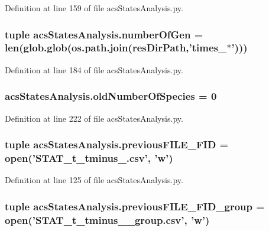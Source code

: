 Definition at line 159 of file acs\-States\-Analysis.\-py.

\hypertarget{a00104_a54acb4eba0735e72c2a820383febd37f}{
\subsubsection[{number\-Of\-Gen}]{\setlength{\rightskip}{0pt plus 5cm}tuple acs\-States\-Analysis.\-number\-Of\-Gen = len(glob.\-glob(os.\-path.\-join({\bf res\-Dir\-Path},'times\-\_\-$\ast$')))}}\label{a00104_a54acb4eba0735e72c2a820383febd37f}


Definition at line 184 of file acs\-States\-Analysis.\-py.

\hypertarget{a00104_abe1ce9bb85ee916d2046efc5c3fe6b30}{
\subsubsection[{old\-Number\-Of\-Species}]{\setlength{\rightskip}{0pt plus 5cm}acs\-States\-Analysis.\-old\-Number\-Of\-Species = 0}}\label{a00104_abe1ce9bb85ee916d2046efc5c3fe6b30}


Definition at line 222 of file acs\-States\-Analysis.\-py.

\hypertarget{a00104_aba65725a1bd6d1b891b02dc7f3db2335}{
\subsubsection[{previous\-F\-I\-L\-E\-\_\-\-F\-I\-D}]{\setlength{\rightskip}{0pt plus 5cm}tuple acs\-States\-Analysis.\-previous\-F\-I\-L\-E\-\_\-\-F\-I\-D = open('S\-T\-A\-T\-\_\-t\-\_\-tminus\-\_.\-csv', 'w')}}\label{a00104_aba65725a1bd6d1b891b02dc7f3db2335}


Definition at line 125 of file acs\-States\-Analysis.\-py.

\hypertarget{a00104_a9e72c152be1f5aac24af10b353b16390}{
\subsubsection[{previous\-F\-I\-L\-E\-\_\-\-F\-I\-D\-\_\-group}]{\setlength{\rightskip}{0pt plus 5cm}tuple acs\-States\-Analysis.\-previous\-F\-I\-L\-E\-\_\-\-F\-I\-D\-\_\-group = open('S\-T\-A\-T\-\_\-t\-\_\-tminus\-\_\-\_\-group.\-csv', 'w')}}\label{a00104_a9e72c152be1f5aac24af10b353b16390}


